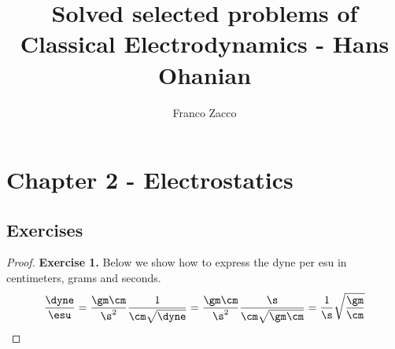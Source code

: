 \documentclass[11pt]{article}
\title{\textbf{Solved selected problems of Classical Electrodynamics - Hans Ohanian}}
\author{Franco Zacco}
\date{}
\theoremstyle{definition}
\begin{document}
\maketitle
\thispagestyle{empty}

\section*{Chapter 2 - Electrostatics}

\subsection*{Exercises}

\begin{proof}{\textbf{Exercise 1.}}
    Below we show how to express the dyne per esu in centimeters, grams
    and seconds. 
    \begin{align*}
        \frac{\dyne}{\esu}
        = \frac{\gm\cm}{\s^2} \frac{1}{\cm\sqrt{\dyne}}
        = \frac{\gm\cm}{\s^2} \frac{\s}{\cm\sqrt{\gm\cm}}
        = \frac{1}{\s}\sqrt{\frac{\gm}{\cm}}
    \end{align*}
\end{proof}
\end{document}
